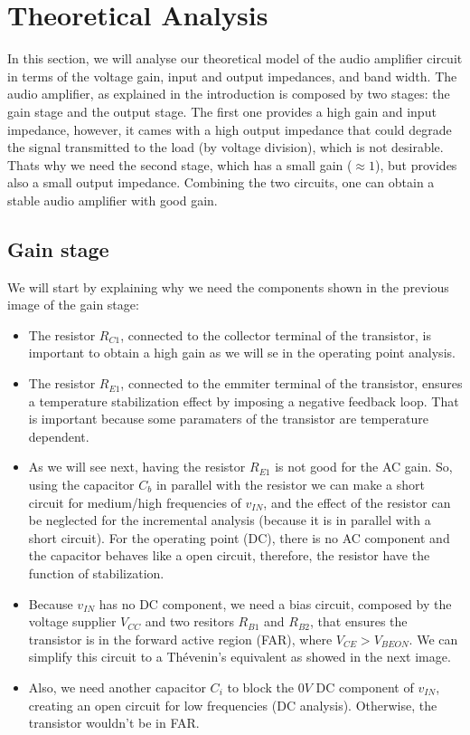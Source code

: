 \section{Theoretical Analysis}
\label{sec:analysis}

\par In this section, we will analyse our theoretical model of the audio amplifier circuit in terms of the voltage gain, input and output impedances, and band width. The audio amplifier, as explained in the introduction is composed by two stages: the gain stage and the output stage. The first one provides a high gain and input impedance, however, it cames with a high output impedance that could degrade the signal transmitted to the load (by voltage division), which is not desirable. Thats why we need the second stage, which has a small gain ($\approx 1$), but provides also a small output impedance. Combining the two circuits, one can obtain a stable audio amplifier with good gain.
 
\subsection{Gain stage}
\label{subsec:gain_stage}


\par We will start by explaining why we need the components shown in the previous image of the gain stage:

\begin{itemize}
\item The resistor $R_{C1}$, connected to the collector terminal of the transistor, is important to obtain a high gain as we will se in the operating point analysis.
\item The resistor $R_{E1}$, connected to the emmiter terminal of the transistor, ensures a temperature stabilization effect by imposing a negative feedback loop. That is important because some paramaters of the transistor are temperature dependent.
\item As we will see next, having the resistor $R_{E1}$ is not good for the AC gain. So, using the capacitor $C_b$ in parallel with the resistor we can make a short circuit for medium/high frequencies of $v_{IN}$, and the effect of the resistor can be neglected for the incremental analysis (because it is in parallel with a short circuit). For the operating point (DC), there is no AC component and the capacitor behaves like a open circuit, therefore, the resistor have the function of stabilization.
\item Because $v_{IN}$ has no DC component, we need a bias circuit, composed by the voltage supplier $V_{CC}$ and two resitors $R_{B1}$ and $R_{B2}$, that ensures the transistor is in the forward active region (FAR), where $V_{CE}>V_{BEON}$. We can simplify this circuit to a Thévenin's equivalent as showed in the next image. 
\item Also, we need another capacitor $C_i$ to block the $0V$ DC component of $v_{IN}$, creating an open circuit for low frequencies (DC analysis). Otherwise, the transistor wouldn't be in FAR. 
\end{itemize}

